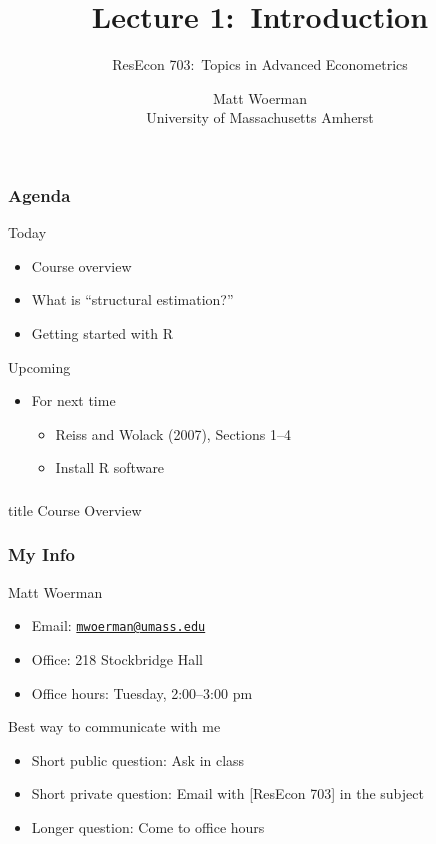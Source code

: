 \documentclass{beamer}\usepackage[]{graphicx}\usepackage[]{color}
\title[Lecture 1:\ Introduction]{Lecture 1:\ Introduction}
\author[ResEcon 703:\ Advanced Econometrics]{ResEcon 703:\ Topics in Advanced Econometrics}
\date{Matt Woerman\\University of Massachusetts Amherst}
\begin{document}
{ 
\begin{frame}[noframenumbering]
    \titlepage
\end{frame}
}

\begin{frame}\frametitle{Agenda}
    Today
    \begin{itemize}
        \item Course overview
        \item What is ``structural estimation?''
        \item Getting started with R
    \end{itemize}
    \vspace{3ex}
    Upcoming
    \begin{itemize}
        \item For next time
        \begin{itemize}
            \item Reiss and Wolack (2007), Sections 1--4
            \item Install R software
        \end{itemize}
    \end{itemize}
\end{frame}

\begin{frame}\frametitle{}
    \vfill
    \centering
    \begin{beamercolorbox}[center]{title}
        \Large Course Overview
    \end{beamercolorbox}
    \vfill
\end{frame}

\begin{frame}\frametitle{My Info}
    Matt Woerman
    \begin{itemize}
        \item Email: \href{mailton:mwoerman@umass.edu}{\texttt{mwoerman@umass.edu}}
        \item Office: 218 Stockbridge Hall
        \item Office hours: Tuesday, 2:00--3:00 pm
    \end{itemize}
    \vspace{3ex}
    Best way to communicate with me
    \begin{itemize}
        \item Short public question: Ask in class
        \item Short private question: Email with [ResEcon 703] in the subject
        \item Longer question: Come to office hours
    \end{itemize}
\end{frame}
\end{document}
